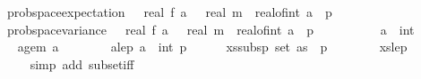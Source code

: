 \begin{isabellebody}
\ \ \ \ prob{\isacharunderscore}{\kern0pt}space{\isachardot}{\kern0pt}expectation\ {\isasymOmega}\ {\isacharparenleft}{\kern0pt}{\isasymlambda}{\isasymomega}{\isachardot}{\kern0pt}\ real\ {\isacharparenleft}{\kern0pt}f\ a\ {\isasymomega}{\isacharparenright}{\kern0pt}{\isacharparenright}{\kern0pt}\ {\isacharequal}{\kern0pt}\ real\ m\ {\isacharasterisk}{\kern0pt}\ {\isacharparenleft}{\kern0pt}real{\isacharunderscore}{\kern0pt}of{\isacharunderscore}{\kern0pt}int\ a{\isacharplus}{\kern0pt}{}{\isacharparenright}{\kern0pt}\ {\isacharslash}{\kern0pt}\ p\ {\isasymand}\isanewline
\ \ \ \ prob{\isacharunderscore}{\kern0pt}space{\isachardot}{\kern0pt}variance\ {\isasymOmega}\ {\isacharparenleft}{\kern0pt}{\isasymlambda}{\isasymomega}{\isachardot}{\kern0pt}\ real\ {\isacharparenleft}{\kern0pt}f\ a\ {\isasymomega}{\isacharparenright}{\kern0pt}{\isacharparenright}{\kern0pt}\ {\isasymle}\ real\ m\ {\isacharasterisk}{\kern0pt}\ {\isacharparenleft}{\kern0pt}real{\isacharunderscore}{\kern0pt}of{\isacharunderscore}{\kern0pt}int\ a{\isacharplus}{\kern0pt}{}{\isacharparenright}{\kern0pt}\ {\isacharslash}{\kern0pt}\ p{\isachardoublequoteclose}\isanewline
\ \ \isamarkupfalse%
\ {\isacharminus}{\kern0pt}\isanewline
\ \ \ \ \isamarkupfalse%
\ a\ {\isacharcolon}{\kern0pt}{\isacharcolon}{\kern0pt}\ int\isanewline
\ \ \ \ \isamarkupfalse%
\ a{\isacharunderscore}{\kern0pt}ge{\isacharunderscore}{\kern0pt}m{}{\isacharcolon}{\kern0pt}\ {\isachardoublequoteopen}a\ {\isasymge}\ {\isacharminus}{\kern0pt}{}{\isachardoublequoteclose}\isanewline
\ \ \ \ \isamarkupfalse%
\ a{\isacharunderscore}{\kern0pt}le{\isacharunderscore}{\kern0pt}p{\isacharcolon}{\kern0pt}\ {\isachardoublequoteopen}a\ {\isacharless}{\kern0pt}\ int\ p{\isachardoublequoteclose}\isanewline
\ \ \ \ \isamarkupfalse%
\ xs{\isacharunderscore}{\kern0pt}subs{\isacharunderscore}{\kern0pt}p{\isacharcolon}{\kern0pt}\ {\isachardoublequoteopen}set\ as\ {\isasymsubseteq}\ {\isacharbraceleft}{\kern0pt}{}{\isachardot}{\kern0pt}{\isachardot}{\kern0pt}{\isacharless}{\kern0pt}p{\isacharbraceright}{\kern0pt}{\isachardoublequoteclose}\isanewline
\ \ \ \ \ \ \isamarkupfalse%
\ xs{\isacharunderscore}{\kern0pt}le{\isacharunderscore}{\kern0pt}p\ \ \isanewline
\ \ \ \ \ \ \isamarkupfalse%
\ {\isacharparenleft}{\kern0pt}simp\ add{\isacharcolon}{\kern0pt}\ subset{\isacharunderscore}{\kern0pt}iff{\isacharparenright}{\kern0pt}\isanewline

\end{isabellebody}
